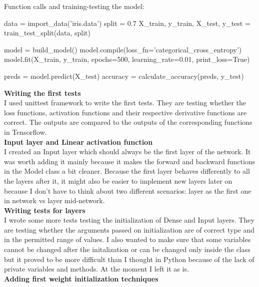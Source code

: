 \documentclass{article}
\begin{document}
Function calls and training-testing the model:
\begin{python}
data = import_data('iris.data')
split = 0.7
X_train, y_train, X_test, y_test = train_test_split(data, split)

model = build_model()
model.compile(loss_fn='categorical_cross_entropy')
model.fit(X_train,
          y_train,
          epochs=500,
          learning_rate=0.01,
          print_loss=True)

preds = model.predict(X_test)
accuracy = calculate_accuracy(preds, y_test)
\end{python}

\textbf{Writing the first tests} \\

I used unittest framework to write the first tests. They are testing whether 
the loss functions, activation functions and their respective derivative functions 
are correct. The outputs are compared to the outputs of the corresponding functions 
in Tensorflow. \\

\textbf{Input layer and Linear activation function} \\

I created an Input layer which should always be the first layer of the network. It was 
worth adding it mainly because it makes the forward and backward functions in the Model 
class a bit cleaner. Because the first layer behaves differently to all the layers after it, 
it might also be easier to implement new layers later on because I don't have to think about 
two different scenarios: layer as the first one in network vs layer mid-network. \\

\textbf{Writing tests for layers} \\

I wrote some more tests testing the initialization of Dense and Input layers. They are testing 
whether the arguments passed on initialization are of correct type and in the permitted 
range of values. I also wanted to make sure that some variables cannot be changed after the 
initalization or can be changed only inside the class but it proved to be more difficult than 
I thought in Python because of the lack of private variables and methods. At the moment I left 
it as is.\\

\textbf{Adding first weight initialization techniques} \\
\end{document}
